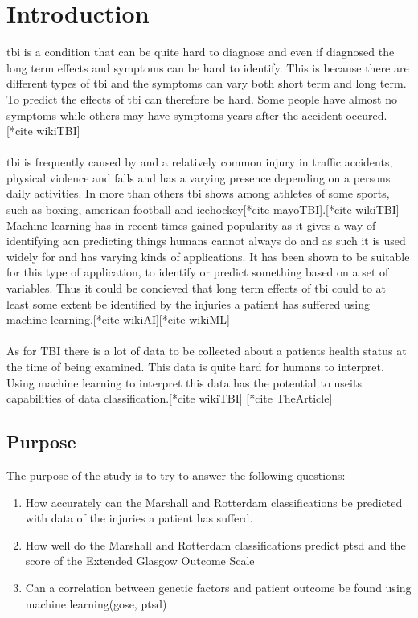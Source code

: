 \documentclass[11pt]{article}
\begin{document}
\newpage
\tableofcontents
\newpage
\section{Introduction}
 \gls{tbi} is a condition that can be quite hard to diagnose and even if diagnosed the long term effects and symptoms can be hard to identify. This is because there are different types of \gls{tbi} and the symptoms can vary both short term and long term. To predict the effects of \gls{tbi} can therefore be hard. Some people have almost no symptoms while others may have symptoms years after the accident occured.[*cite wikiTBI] \\
\\
\gls{tbi} is frequently caused by and a relatively common injury in traffic accidents, physical violence and falls and has a varying presence depending on a persons daily activities. In more than others \gls{tbi} shows among athletes of some sports, such as boxing, american football and icehockey[*cite mayoTBI].[*cite wikiTBI]
\\
Machine learning has in recent times gained popularity as it gives a way of identifying acn predicting things humans cannot always do and as such it is used widely for and has varying kinds of applications. It has been shown to be suitable for this type of application, to identify or predict something based on a set of variables. Thus it could be concieved that long term effects of \gls{tbi} could to at least some extent be identified by the injuries a patient has suffered using machine learning.[*cite wikiAI][*cite wikiML]\\
\\
As for \gls{TBI} there is a lot of data to be collected about a patients health status at the time of being examined. This data is quite hard for humans to interpret. Using machine learning to interpret this data has the potential to useits capabilities of data classification.[*cite wikiTBI] [*cite TheArticle]

\subsection{Purpose}
The purpose of the study is to try to answer the following questions:

\begin{enumerate}
  \item{How accurately can the Marshall and Rotterdam classifications be predicted with data of the injuries a patient has sufferd.}
  \item{How well do the Marshall and Rotterdam classifications predict \gls{ptsd} and the score of the Extended Glasgow Outcome Scale}
  \item{Can a correlation between genetic factors and patient outcome be found using machine learning(\gls{gose}, \gls{ptsd})}
\end{enumerate}
\end{document}
